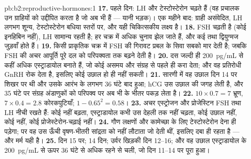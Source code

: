 \begin{solution}{pb:b2:reproductive-hormones:1}
\textbf{17.} पहले दिन: LH और टेस्टोस्टेरोन चढ़ते हैं (वह प्रचालक उन
ग्राहियों को उद्दीपित करता है जो अब भी हैं --- यानी भड़क)। एक महीने बाद:
ग्राही असंवेदित, LH लगभग शून्य, टेस्टोस्टेरोन बधिया
स्तरों पर, और यही चिकित्सकीय लक्ष्य है।
\textbf{18.} FSH चढ़ती है (कोई इनहिबिन नहीं), LH सामान्य रहती है;
हर चक्र में अधिक  चुनाव झेल जाते हैं, और कई  तथा
द्वियुग्मज जुड़वाँ होते हैं।
\textbf{19.} किसी प्राकृतिक चक्र में FSH की गिरावट प्रबल  के
सिवा सबको मार देती है; जबकि FSH की अचर आपूर्ति पूरे दल को
परिपक्वता तक बढ़ने देती है।
\textbf{20.} दस  जल्दी ही \qty{200}{pg/mL} से कहीं अधिक
एस्ट्राडायोल बनाते हैं, जो कोई असमय  और संग्रह से
पहले ही  करा देता; और वह प्रतिरोधी GnRH रोक देता है, इसलिए कोई
उछाल हो ही नहीं सकती।
\textbf{21.} सारणी में वह उछाल दिन 14 पर शिखर पर थी और 
उसके आरंभ के लगभग 36 घंटे बाद हुआ; hCG उस उछाल की जगह लेती है,
और 35 घंटे पर संग्रह अंडाणुकों को परिपक्व पर अब भी
 के भीतर पकड़ लेता है।
\textbf{22.} $10\times 0.7 = 7$ भ्रूण, $7\times 0.4 = 2.8$
कोरकपुटियाँ; $1 - 0.65^{2} = 0.58$।
\textbf{23.} अचर एस्ट्रोजन और प्रोजेस्टिन FSH तथा LH नीची रखते हैं: कोई
 नहीं बढ़ता, एस्ट्राडायोल कभी उस देहली तक नहीं चढ़ता, कोई उछाल नहीं,
कोई  नहीं, कोई प्रोजेस्टेरोन-चढ़ाई नहीं।
\textbf{24.} गौण लक्षणों और कामेच्छा के लिए टेस्टोस्टेरोन देना ही पड़ेगा;
पर वह उस ऊँची वृषण-भीतरी सांद्रता को नहीं लौटाता
जो  देती थीं, इसलिए  दबा ही
रहता है --- और मर्म यही है।
\textbf{25.}  दिन 15 पर;  14 दिन; उर्वर
खिड़की दिन 12--16; और वह उछाल एस्ट्राडायोल के
\qty{200}{pg/mL} से ऊपर 36 घंटे से अधिक रहने से चली, जो दिन 11--14 पर पूरा हुआ।
\end{solution}
